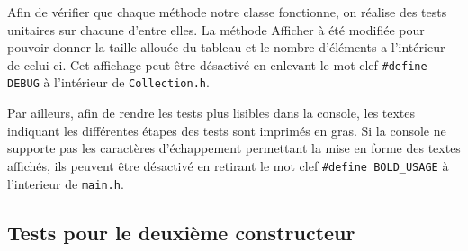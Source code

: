 \documentclass[10pt]{article}
\begin{document}
Afin de vérifier que chaque méthode  notre classe fonctionne, on réalise des tests unitaires sur chacune d'entre elles. La méthode Afficher à été modifiée pour pouvoir donner la taille allouée du tableau et le nombre d'éléments a l'intérieur de celui-ci. Cet affichage peut être désactivé en enlevant le mot clef \texttt{\#define DEBUG} à l'intérieur de \texttt{Collection.h}.

Par ailleurs, afin de rendre les tests plus lisibles dans la console, les textes indiquant les différentes étapes des tests sont imprimés en gras. Si la console ne supporte pas les caractères d'échappement permettant la mise en forme des textes affichés, ils peuvent être désactivé en retirant le mot clef \texttt{\#define~BOLD\_USAGE} à l'interieur de \texttt{main.h}.


\subsection{Tests pour le deuxième constructeur}
\end{document}

